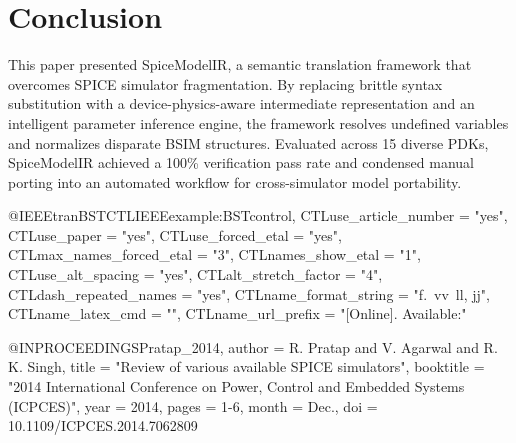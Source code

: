 \documentclass[conference]{IEEEtran}
\begin{document}
\section{Conclusion}
\label{sec:conclusion}
This paper presented SpiceModelIR, a semantic translation framework that overcomes SPICE simulator fragmentation. By replacing brittle syntax substitution with a device-physics-aware intermediate representation and an intelligent parameter inference engine, the framework resolves undefined variables and normalizes disparate BSIM structures. Evaluated across 15 diverse PDKs, SpiceModelIR achieved a 100\% verification pass rate and condensed manual porting into an automated workflow for cross-simulator model portability.













@IEEEtranBSTCTL{IEEEexample:BSTcontrol,
  CTLuse_article_number     = "yes",
  CTLuse_paper              = "yes",
  CTLuse_forced_etal        = "yes",
  CTLmax_names_forced_etal  = "3",
  CTLnames_show_etal        = "1",
  CTLuse_alt_spacing        = "yes",
  CTLalt_stretch_factor     = "4",
  CTLdash_repeated_names    = "yes",
  CTLname_format_string     = "{f.~}{vv~}{ll}{, jj}",
  CTLname_latex_cmd         = "",
  CTLname_url_prefix        = "[Online]. Available:"
}


@INPROCEEDINGS{Pratap_2014,
    author      =   {R. {Pratap} and V. {Agarwal} and R. K. {Singh}},
    title       =   "{Review of various available {SPICE} simulators}",
    booktitle   =   "{2014 International Conference on Power, Control and Embedded Systems (ICPCES)}",
    year        =   {2014},
    pages       =   {1-6},
    month       =   {Dec.},
    doi         =   {10.1109/ICPCES.2014.7062809}
}
\end{document}
